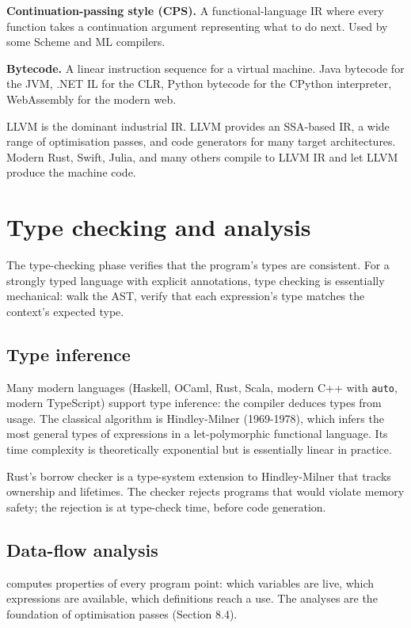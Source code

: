\textbf{Continuation-passing style (CPS).} A functional-language IR where every function takes a continuation argument representing what to do next. Used by some Scheme and ML compilers.

\textbf{Bytecode.} A linear instruction sequence for a virtual machine. Java bytecode for the JVM, .NET IL for the CLR, Python bytecode for the CPython interpreter, WebAssembly for the modern web.

LLVM \cite{paper:lattner-adve-llvm-2004} is the dominant industrial IR. LLVM provides an SSA-based IR, a wide range of optimisation passes, and code generators for many target architectures. Modern Rust, Swift, Julia, and many others compile to LLVM IR and let LLVM produce the machine code.

\section{Type checking and analysis}

The type-checking phase verifies that the program's types are consistent. For a strongly typed language with explicit annotations, type checking is essentially mechanical: walk the AST, verify that each expression's type matches the context's expected type.

\subsection{Type inference}

Many modern languages (Haskell, OCaml, Rust, Scala, modern C++ with \texttt{auto}, modern TypeScript) support type inference: the compiler deduces types from usage. The classical algorithm is Hindley-Milner (1969-1978), which infers the most general types of expressions in a let-polymorphic functional language. Its time complexity is theoretically exponential but is essentially linear in practice.

Rust's borrow checker is a type-system extension to Hindley-Milner that tracks ownership and lifetimes. The checker rejects programs that would violate memory safety; the rejection is at type-check time, before code generation.

\subsection{Data-flow analysis}

 computes properties of every program point: which variables are live, which expressions are available, which definitions reach a use. The analyses are the foundation of optimisation passes (Section 8.4).

